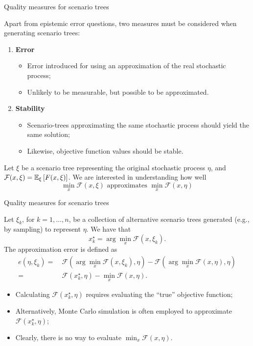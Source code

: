\begin{frame}{Quality measures for scenario trees}

	Apart from \alert{epistemic error} questions, two measures must be considered when generating scenario trees:
	
	\begin{enumerate}
		\item {\bf Error}
		\begin{itemize}
			\item Error introduced for using an \alert{approximation} of the real stochastic process;
			\item Unlikely to be measurable, but possible to be approximated.
		\end{itemize}
		\vfill
		\item {\bf Stability}
		\begin{itemize}
			\item Scenario-trees approximating the same stochastic process should yield the same solution;
			\item Likewise, objective function values should be \alert{stable}.
		\end{itemize}		
	\end{enumerate}
	
	\pause
	Let $\xi$ be a scenario tree representing the original \alert{stochastic process $\eta$}, and $\mathcal{F}(x, \xi) = \mathbb{E}_\xi\left[ F(x,\xi) \right]$. We are interested in understanding how well
		$$
		\min_{x} \mathcal{F}(x, \xi) \text{ approximates }
		\min_{x} \mathcal{F}(x, \eta)
		$$		
	
\end{frame}


\begin{frame}{Quality measures for scenario trees}

	Let $\xi_k$, for $k=1,\dots,n$, be a collection of alternative scenario trees generated (e.g., by sampling) to represent $\eta$. We have that
	$$
		x_k^\star = \arg\min_{x} \mathcal{F}(x, \xi_k).
	$$ 
	\pause
	The \alert{approximation error} {\small \cite{pflug2001scenario}} is defined as 
	\begin{align*}
		e(\eta, \xi_k) =~ & \mathcal{F}(\arg\min_{x} \mathcal{F}(x, \xi_k), \eta) - 	\mathcal{F}(\arg\min_{x} \mathcal{F}(x, \eta), \eta) \\
		=~ & \mathcal{F}(x_k^\star, \eta) - \min_{x} \mathcal{F}(x, \eta). 
	\end{align*}
	\pause

	\vspace{-18pt}
	\begin{itemize}
		\item Calculating $\mathcal{F}(x_k^\star, \eta)$ requires evaluating the ``true'' objective function;
		\item Alternatively, \alert{Monte Carlo simulation} is often employed to approximate $\mathcal{F}(x_k^\star, \eta)$;
		\item Clearly, there is no way to evaluate $\min_{x} \mathcal{F}(x, \eta)$.
	\end{itemize}

\end{frame}


